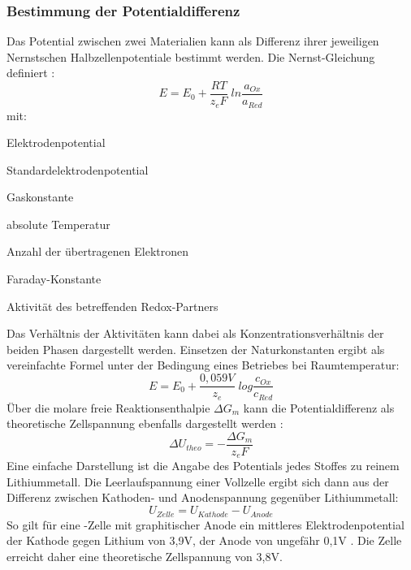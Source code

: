 \documentclass[a4paper, 11pt, headsepline,footsepline,twoside,abstract]{scrbook}
\begin{document}
\subsubsection{Bestimmung der Potentialdifferenz}
Das Potential zwischen zwei Materialien kann als Differenz ihrer jeweiligen Nernstschen Halbzellenpotentiale bestimmt werden. Die Nernst-Gleichung definiert \cite{atkins2006physical}:
\begin{equation}
E = E_0 + \frac{RT}{z_eF}\; ln \frac{a_{Ox}}{a_{Red}}
\end{equation}
mit:
\begin{description}\itemsep0pt
\item[E] Elektrodenpotential
\item[E$_0$] Standardelektrodenpotential
\item[R] Gaskonstante
\item[T] absolute Temperatur
\item[z$_e$] Anzahl der übertragenen Elektronen
\item[F] Faraday-Konstante
\item[a] Aktivität des betreffenden Redox-Partners
\end{description}
Das Verhältnis der Aktivitäten kann dabei als Konzentrationsverhältnis der beiden Phasen dargestellt werden. Einsetzen der Naturkonstanten ergibt als vereinfachte Formel unter der Bedingung eines Betriebes bei Raumtemperatur:
\begin{equation}
E = E_0 + \frac{0,059 V}{z_e} \; log \frac{c_{Ox}}{c_{Red}}
\end{equation}
Über die molare freie Reaktionsenthalpie $\Delta G_m$ kann die Potentialdifferenz als theoretische Zellspannung ebenfalls dargestellt werden \cite{mortimer}:
\begin{equation}
\Delta U_{theo} = -\frac{\Delta G_m}{z_eF}
\end{equation}
Eine einfache Darstellung ist die Angabe des Potentials jedes Stoffes zu reinem Lithiummetall. Die Leerlaufspannung einer Vollzelle ergibt sich dann aus der Differenz zwischen Kathoden- und Anodenspannung gegenüber Lithiummetall:
\begin{equation}
U_{Zelle} = U_{Kathode} - U_{Anode}
\end{equation}
So gilt für eine -Zelle mit graphitischer Anode ein mittleres Elektrodenpotential der Kathode gegen Lithium von 3,9V, der Anode von ungefähr 0,1V \cite{bub_skript}. Die Zelle erreicht daher eine theoretische Zellspannung von 3,8V.
\end{document}
